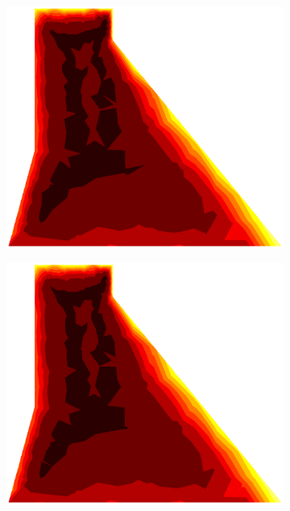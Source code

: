 \documentclass[10pt, a4paper]{article}
\begin{document}
\begin{figure}[H]
\begin{subfigure}[H]{0.19\textwidth}
		\includegraphics[width=1.2\textwidth]{fig/18.eps}
	\end{subfigure}
	\begin{subfigure}[H]{0.19\textwidth}
		\includegraphics[width=1.2\textwidth]{fig/19.eps}
	\end{subfigure}
		\begin{subfigure}[H]{0.19\textwidth}

\end{subfigure}
\end{figure}
\end{document}
